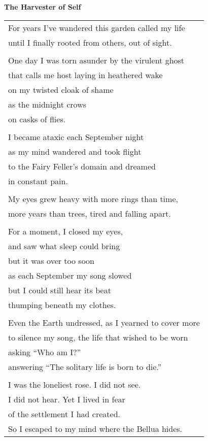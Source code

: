 \documentclass{article}
\begin{document}
\begin{center}
\textbf{The Harvester of Self} \\
\vspace*{2ex}
\begin{tabular}{l}
For years I've wandered this garden called my life \\
until I finally rooted from others, out of sight. \\
\\
One day I was torn asunder by the virulent ghost \\
that calls me host laying in heathered wake \\
on my twisted cloak of shame \\
as the midnight crows \\
on casks of flies. \\
\\
I became ataxic each September night \\
as my mind wandered and took flight \\
to the Fairy Feller's domain and dreamed \\
in constant pain. \\
\\
My eyes grew heavy with more rings than time, \\
more years than trees, tired and falling apart. \\
\\
For a moment, I closed my eyes, \\
and saw what sleep could bring \\
but it was over too soon \\
as each September my song slowed \\
but I could still hear its beat \\
thumping beneath my clothes. \\
\\
Even the Earth undressed, as I yearned to cover more \\
to silence my song, the life that wished to be worn \\
asking ``Who am I?'' \\
answering ``The solitary life is born to die.'' \\
\\
I was the loneliest rose.  I did not see. \\
I did not hear.  Yet I lived in fear \\
of the settlement I had created. \\
So I escaped to my mind where the Bellua hides. \\

\end{tabular}
\end{center}
\end{document}
